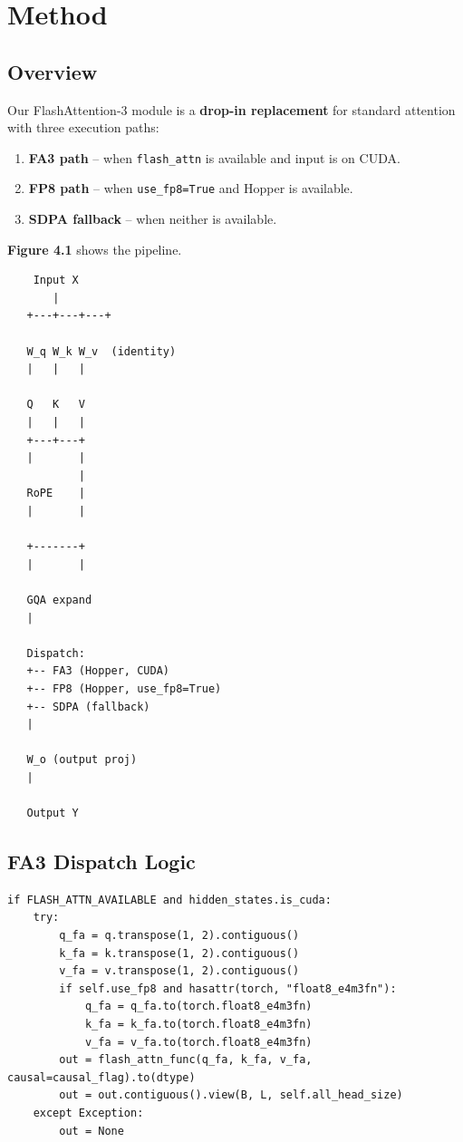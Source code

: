 \section{Method}

\subsection{Overview}

Our FlashAttention-3 module is a \textbf{drop-in replacement} for standard 
attention with three execution paths:

\begin{enumerate}
\item \textbf{FA3 path} -- when \texttt{flash\_attn} is available and input is on CUDA.
\item \textbf{FP8 path} -- when \texttt{use\_fp8=True} and Hopper is available.
\item \textbf{SDPA fallback} -- when neither is available.

\end{enumerate}
\textbf{Figure 4.1} shows the pipeline.

\begin{lstlisting}
    Input X
       |
   +---+---+---+
                
   W_q W_k W_v  (identity)
   |   |   |
            
   Q   K   V
   |   |   |
   +---+---+
   |       |
           |
   RoPE    |
   |       |
            
   +-------+
   |       |
            
   GQA expand
   |
    
   Dispatch:
   +-- FA3 (Hopper, CUDA)
   +-- FP8 (Hopper, use_fp8=True)
   +-- SDPA (fallback)
   |
    
   W_o (output proj)
   |
    
   Output Y
\end{lstlisting}

\subsection{FA3 Dispatch Logic}

\begin{lstlisting}
if FLASH_ATTN_AVAILABLE and hidden_states.is_cuda:
    try:
        q_fa = q.transpose(1, 2).contiguous()
        k_fa = k.transpose(1, 2).contiguous()
        v_fa = v.transpose(1, 2).contiguous()
        if self.use_fp8 and hasattr(torch, "float8_e4m3fn"):
            q_fa = q_fa.to(torch.float8_e4m3fn)
            k_fa = k_fa.to(torch.float8_e4m3fn)
            v_fa = v_fa.to(torch.float8_e4m3fn)
        out = flash_attn_func(q_fa, k_fa, v_fa, causal=causal_flag).to(dtype)
        out = out.contiguous().view(B, L, self.all_head_size)
    except Exception:
        out = None
\end{lstlisting}

